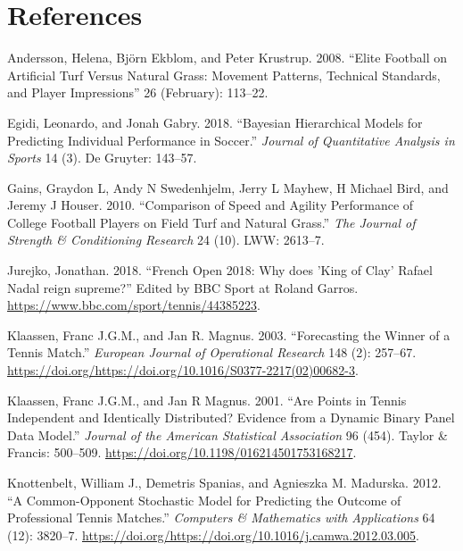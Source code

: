 \documentclass[]{article}
\begin{document}
\hypertarget{sec:refs}{%
\section{References}\label{sec:refs}}

\footnotesize

\hypertarget{refs}{}
\leavevmode\hypertarget{ref-andersson2008}{}%
Andersson, Helena, Björn Ekblom, and Peter Krustrup. 2008. ``Elite
Football on Artificial Turf Versus Natural Grass: Movement Patterns,
Technical Standards, and Player Impressions'' 26 (February): 113--22.

\leavevmode\hypertarget{ref-egidi2018}{}%
Egidi, Leonardo, and Jonah Gabry. 2018. ``Bayesian Hierarchical Models
for Predicting Individual Performance in Soccer.'' \emph{Journal of
Quantitative Analysis in Sports} 14 (3). De Gruyter: 143--57.

\leavevmode\hypertarget{ref-gains2010}{}%
Gains, Graydon L, Andy N Swedenhjelm, Jerry L Mayhew, H Michael Bird,
and Jeremy J Houser. 2010. ``Comparison of Speed and Agility Performance
of College Football Players on Field Turf and Natural Grass.'' \emph{The
Journal of Strength \& Conditioning Research} 24 (10). LWW: 2613--7.

\leavevmode\hypertarget{ref-bbc2018}{}%
Jurejko, Jonathan. 2018. ``French Open 2018: Why does 'King of Clay'
Rafael Nadal reign supreme?'' Edited by BBC Sport at Roland Garros.
\url{https://www.bbc.com/sport/tennis/44385223}.

\leavevmode\hypertarget{ref-klaassen2003}{}%
Klaassen, Franc J.G.M., and Jan R. Magnus. 2003. ``Forecasting the
Winner of a Tennis Match.'' \emph{European Journal of Operational
Research} 148 (2): 257--67.
\url{https://doi.org/https://doi.org/10.1016/S0377-2217(02)00682-3}.

\leavevmode\hypertarget{ref-klaassen2001}{}%
Klaassen, Franc J.G.M., and Jan R Magnus. 2001. ``Are Points in Tennis
Independent and Identically Distributed? Evidence from a Dynamic Binary
Panel Data Model.'' \emph{Journal of the American Statistical
Association} 96 (454). Taylor \& Francis: 500--509.
\url{https://doi.org/10.1198/016214501753168217}.

\leavevmode\hypertarget{ref-knottenbelt2012}{}%
Knottenbelt, William J., Demetris Spanias, and Agnieszka M. Madurska.
2012. ``A Common-Opponent Stochastic Model for Predicting the Outcome of
Professional Tennis Matches.'' \emph{Computers \& Mathematics with
Applications} 64 (12): 3820--7.
\url{https://doi.org/https://doi.org/10.1016/j.camwa.2012.03.005}.
\end{document}
